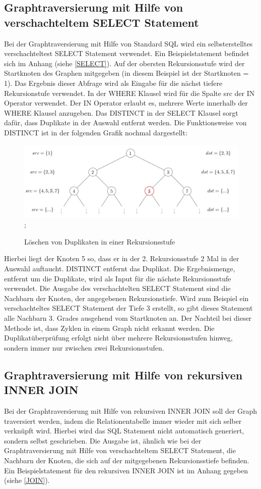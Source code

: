 \subsection{Graphtraversierung mit Hilfe von verschachteltem SELECT Statement}
Bei der Graphtraversierung mit Hilfe von Standard \ac{SQL} wird ein selbsterstelltes verschachteltest SELECT Statement verwendet. Ein Beispielstatement befindet sich im Anhang (siehe \ref{SELECT}).
Auf der obersten Rekursionsstufe wird der Startknoten des Graphen mitgegeben (in diesem Beispiel ist der Startknoten = 1). Das Ergebnis dieser Abfrage wird als Eingabe
für die nächst tiefere Rekursionstufe verwendet. In der WHERE Klausel wird für die Spalte src der IN Operator verwendet. Der IN Operator erlaubt es, mehrere Werte innerhalb
der WHERE Klausel anzugeben. Das DISTINCT in der SELECT Klausel sorgt dafür, dass Duplikate in der Auswahl entfernt werden. Die Funktionsweise von DISTINCT ist in der folgenden
Grafik nochmal dargestellt:
\begin{figure}[H]
    \includegraphics[width = \linewidth]{images/Distinct.jpg};
    \caption{Löschen von Duplikaten in einer Rekursionsstufe}
\end{figure}
Hierbei liegt der Knoten 5 so, dass er in der 2. Rekursionsstufe 2 Mal in der Auswahl auftaucht. DISTINCT entfernt das Duplikat. Die Ergebnismenge, entfernt um die
Duplikate, wird als Input für die nächste Rekursionsstufe verwendet.
Die Ausgabe des verschachtelten SELECT Statement sind die Nachbarn der Knoten, der angegebenen Rekursionstiefe. Wird zum Beispiel ein
verschachteltes SELECT Statement der Tiefe 3 erstellt, so gibt dieses Statement alle Nachbarn 3. Grades ausgehend vom Startknoten an. Der Nachteil bei dieser Methode ist, dass
Zyklen in einem Graph nicht erkannt werden. Die Duplikatüberprüfung erfolgt nicht über mehrere Rekursionsstufen hinweg, sondern immer nur zwischen zwei Rekursionsstufen.

\subsection{Graphtraversierung mit Hilfe von rekursiven INNER JOIN}
Bei der Graphtraversierung mit Hilfe von rekursiven INNER JOIN soll der Graph traversiert werden, indem die Relationentabelle immer wieder mit sich selber verknüpft wird. Hierbei
wird das \ac{SQL} Statement nicht automatisch generiert, sondern selbst geschrieben.
Die Ausgabe ist, ähnlich wie bei der Graphtraversierung mit Hilfe von verschachteltem SELECT Statement, die Nachbarn der Knoten, die sich auf der mitgegebenen Rekursionsstiefe
befinden. Ein Beispielstatement für den rekursiven INNER JOIN ist im Anhang gegeben (siehe \ref{JOIN}).

